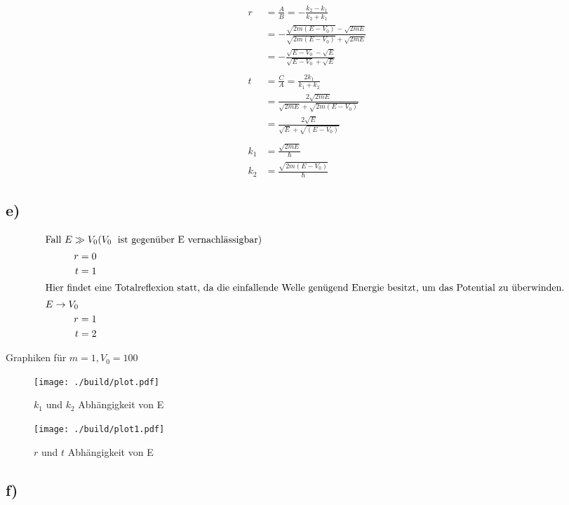     \begin{align*}
        r  &= \frac{A}{B} = -\frac{k_2-k_1}{k_2+k_1}\\
        &= -\frac{\sqrt{2m(E-V_0)} - \sqrt{2mE}}{\sqrt{2m(E-V_0)} + \sqrt{2mE}}\\
        &= -\frac{\sqrt{E-V_0} - \sqrt{E}}{\sqrt{E-V_0} + \sqrt{E}}\\
        \\
        t &= \frac{C}{A} = \frac{2k_1}{k_1 + k_2}\\
        &= \frac{2\sqrt{2mE}}{\sqrt{2mE} + \sqrt{2m(E-V_0)}}\\
        &= \frac{2\sqrt{E}}{\sqrt{E} + \sqrt{(E-V_0)}}\\
        \\
        k_1 &= \frac{\sqrt{2mE}}{\hbar}\\
        k_2 &= \frac{\sqrt{2m(E-V_0)}}{\hbar}
    \end{align*}

\subsection{e)}

    \begin{align*}
        \intertext{Fall $E \gg V_0  (V_0\;$ ist gegenüber E vernachlässigbar)
        }
        r &= 0\\
        t &= 1\\
        \intertext{Hier findet eine Totalreflexion statt, da die einfallende Welle genügend Energie besitzt, um
        das Potential zu überwinden.
        }
        E \rightarrow V_0\\
        r &= 1\\
        t &= 2
    \end{align*}

     
    Graphiken für $m=1, V_0 =100$
    \begin{figure}[H]
        \centering
        \texttt{[image: ./build/plot.pdf]}
        \caption{$k_1$ und $k_2$ Abhängigkeit von E}
    \end{figure}
    \begin{figure}[H]
        \centering
        \texttt{[image: ./build/plot1.pdf]}
        \caption{$r$ und $t$ Abhängigkeit von E}
    \end{figure}
\subsection{f)}

